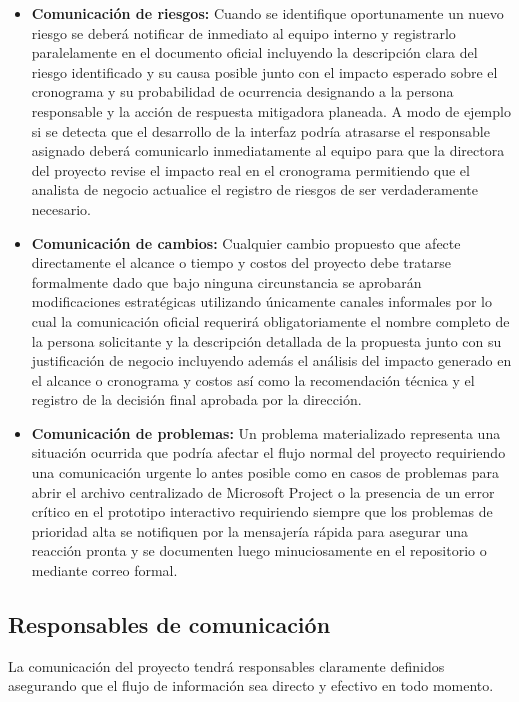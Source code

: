 \documentclass[11pt,spanish]{article}
\begin{document}
\begin{itemize}
    \item \textbf{Comunicación de riesgos:} Cuando se identifique oportunamente un nuevo riesgo se deberá notificar de inmediato al equipo interno y registrarlo paralelamente en el documento oficial incluyendo la descripción clara del riesgo identificado y su causa posible junto con el impacto esperado sobre el cronograma y su probabilidad de ocurrencia designando a la persona responsable y la acción de respuesta mitigadora planeada. A modo de ejemplo si se detecta que el desarrollo de la interfaz podría atrasarse el responsable asignado deberá comunicarlo inmediatamente al equipo para que la directora del proyecto revise el impacto real en el cronograma permitiendo que el analista de negocio actualice el registro de riesgos de ser verdaderamente necesario.
    \item \textbf{Comunicación de cambios:} Cualquier cambio propuesto que afecte directamente el alcance o tiempo y costos del proyecto debe tratarse formalmente dado que bajo ninguna circunstancia se aprobarán modificaciones estratégicas utilizando únicamente canales informales por lo cual la comunicación oficial requerirá obligatoriamente el nombre completo de la persona solicitante y la descripción detallada de la propuesta junto con su justificación de negocio incluyendo además el análisis del impacto generado en el alcance o cronograma y costos así como la recomendación técnica y el registro de la decisión final aprobada por la dirección.
    \item \textbf{Comunicación de problemas:} Un problema materializado representa una situación ocurrida que podría afectar el flujo normal del proyecto requiriendo una comunicación urgente lo antes posible como en casos de problemas para abrir el archivo centralizado de Microsoft Project o la presencia de un error crítico en el prototipo interactivo requiriendo siempre que los problemas de prioridad alta se notifiquen por la mensajería rápida para asegurar una reacción pronta y se documenten luego minuciosamente en el repositorio o mediante correo formal.
\end{itemize}

\subsection{Responsables de comunicación}

La comunicación del proyecto tendrá responsables claramente definidos asegurando que el flujo de información sea directo y efectivo en todo momento.
\end{document}
